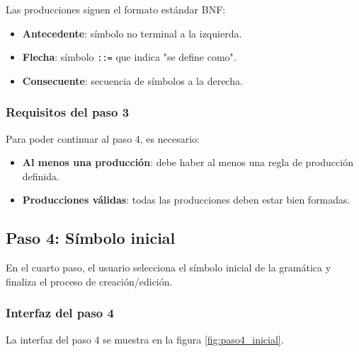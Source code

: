 Las producciones siguen el formato estándar BNF:

\begin{itemize}
    \item \textbf{Antecedente}: símbolo no terminal a la izquierda.
    \item \textbf{Flecha}: símbolo \texttt{::=} que indica \string"se define como\string".
    \item \textbf{Consecuente}: secuencia de símbolos a la derecha.
\end{itemize}

\subsubsection{Requisitos del paso 3}

Para poder continuar al paso 4, es necesario:

\begin{itemize}
    \item \textbf{Al menos una producción}: debe haber al menos una regla de producción definida.
    \item \textbf{Producciones válidas}: todas las producciones deben estar bien formadas.
\end{itemize}

\subsection{Paso 4: Símbolo inicial}

En el cuarto paso, el usuario selecciona el símbolo inicial de la gramática y finaliza el proceso de creación/edición.

\subsubsection{Interfaz del paso 4}

La interfaz del paso 4 se muestra en la figura \ref{fig:paso4_inicial}.

